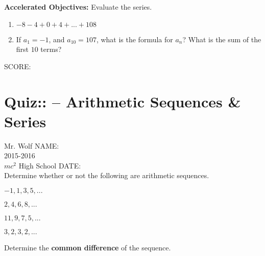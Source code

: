 \documentclass[12pt]{article}
\begin{document}
\textbf{Accelerated Objectives:} Evaluate the series.

\begin{enumerate}[resume]
\setlength\itemsep{1.7cm}

	\item $-8-4+0+4+...+108$\\
	
	\item If $a_1=-1$, and $a_{10}=107$, what is the formula for $a_n$? What is the sum of the first $10$ terms?

\end{enumerate}

\vfill SCORE:\underline{\hspace{1in}}

\section*{Quiz:: -- Arithmetic Sequences \& Series}

Mr. Wolf \hfill NAME:\underline{\hspace{3in}}\\
2015-2016\\
$mc^2$ High School \hfill DATE:\underline{\hspace{2in}}\\

Determine whether or not the following are arithmetic sequences.

\begin{enumerate}
\begin{multicols}{2}
\setlength\itemsep{1.2cm}

	\item $-1,1,3,5,...$\\
	
	\item $2,4,6,8,...$\\
	
	\item $11,9,7,5,...$\\
	
	\item $3,2,3,2,...$\\

\end{multicols}
\end{enumerate}

Determine the \textbf{common difference} of the sequence.
\end{document}
